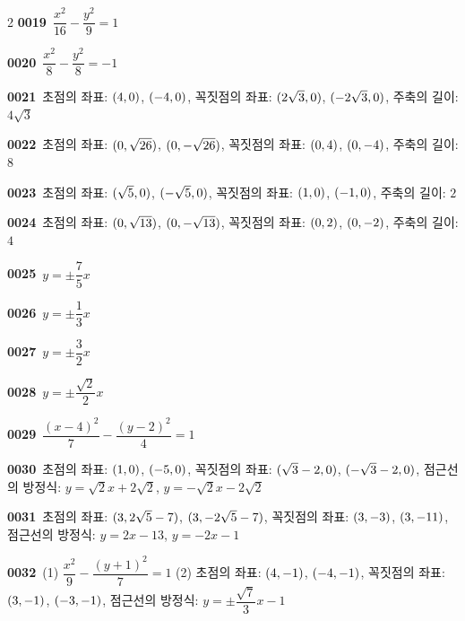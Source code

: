 \documentclass[10pt,a4paper]{article}
\begin{document}
\begin{multicols}{2}
\noindent\textbf{0019}\ $\dfrac{x^2}{16}-\dfrac{y^2}{9}=1$\par
\noindent\textbf{0020}\ $\dfrac{x^2}{8}-\dfrac{y^2}{8}=-1$\par
\noindent\textbf{0021}\ 초점의 좌표: $(4{,}\mkern3mu\mathopen{}0)$, $(-4{,}\mkern3mu\mathopen{}0)$, 꼭짓점의 좌표: $(2\sqrt{3}{,}\mkern3mu\mathopen{}0)$, $(-2\sqrt{3}{,}\mkern3mu\mathopen{}0)$, 주축의 길이: $4\sqrt{3}$\par
\noindent\textbf{0022}\ 초점의 좌표: $(0{,}\mkern3mu\mathopen{}\sqrt{26})$, $(0{,}\mkern3mu\mathopen{}-\sqrt{26})$, 꼭짓점의 좌표: $(0{,}\mkern3mu\mathopen{}4)$, $(0{,}\mkern3mu\mathopen{}-4)$, 주축의 길이: $8$\par
\noindent\textbf{0023}\ 초점의 좌표: $(\sqrt{5}{,}\mkern3mu\mathopen{}0)$, $(-\sqrt{5}{,}\mkern3mu\mathopen{}0)$, 꼭짓점의 좌표: $(1{,}\mkern3mu\mathopen{}0)$, $(-1{,}\mkern3mu\mathopen{}0)$, 주축의 길이: $2$\par
\noindent\textbf{0024}\ 초점의 좌표: $(0{,}\mkern3mu\mathopen{}\sqrt{13})$, $(0{,}\mkern3mu\mathopen{}-\sqrt{13})$, 꼭짓점의 좌표: $(0{,}\mkern3mu\mathopen{}2)$, $(0{,}\mkern3mu\mathopen{}-2)$, 주축의 길이: $4$\par
\noindent\textbf{0025}\ $y=\pm\dfrac{7}{5}x$\par
\noindent\textbf{0026}\ $y=\pm\dfrac{1}{3}x$\par
\noindent\textbf{0027}\ $y=\pm\dfrac{3}{2}x$\par
\noindent\textbf{0028}\ $y=\pm\dfrac{\sqrt{2}}{2}x$\par
\noindent\textbf{0029}\ $\dfrac{(x-4)^2}{7}-\dfrac{(y-2)^2}{4}=1$\par
\noindent\textbf{0030}\ 초점의 좌표: $(1{,}\mkern3mu\mathopen{}0)$, $(-5{,}\mkern3mu\mathopen{}0)$, 꼭짓점의 좌표: $(\sqrt{3}-2{,}\mkern3mu\mathopen{}0)$, $(-\sqrt{3}-2{,}\mkern3mu\mathopen{}0)$, 점근선의 방정식: $y=\sqrt{2}x+2\sqrt{2}$, $y=-\sqrt{2}x-2\sqrt{2}$\par
\noindent\textbf{0031}\ 초점의 좌표: $(3{,}\mkern3mu\mathopen{}2\sqrt{5}-7)$, $(3{,}\mkern3mu\mathopen{}-2\sqrt{5}-7)$, 꼭짓점의 좌표: $(3{,}\mkern3mu\mathopen{}-3)$, $(3{,}\mkern3mu\mathopen{}-11)$, 점근선의 방정식: $y=2x-13$, $y=-2x-1$\par
\noindent\textbf{0032}\ (1) $\dfrac{x^2}{9}-\dfrac{(y+1)^2}{7}=1$ \quad (2) 초점의 좌표: $(4{,}\mkern3mu\mathopen{}-1)$, $(-4{,}\mkern3mu\mathopen{}-1)$, 꼭짓점의 좌표: $(3{,}\mkern3mu\mathopen{}-1)$, $(-3{,}\mkern3mu\mathopen{}-1)$, 점근선의 방정식: $y=\pm\dfrac{\sqrt{7}}{3}x-1$\par

\end{multicols}
\end{document}
